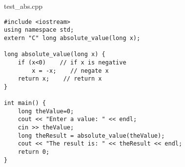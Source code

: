 \begin{frame}[fragile,label=absValueC]{test\_abs.cpp}
\lstset{
    language=C++,
    style=smaller,
}
\begin{lstlisting}
#include <iostream>
using namespace std;
extern "C" long absolute_value(long x);

long absolute_value(long x) {
    if (x<0)    // if x is negative
        x = -x;    // negate x
    return x;    // return x
}

int main() {
    long theValue=0;
    cout << "Enter a value: " << endl;
    cin >> theValue;
    long theResult = absolute_value(theValue);
    cout << "The result is: " << theResult << endl;
    return 0;
}
\end{lstlisting}
\end{frame}
